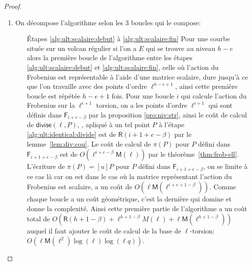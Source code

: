 \documentclass[10pt,a4paper]{book}
\theoremstyle{plain}
\theoremstyle{definition}
\theoremstyle{definition}
\theoremstyle{definition}
\theoremstyle{definition}
\theoremstyle{remark}
\theoremstyle{remark}
\theoremstyle{definition}
\begin{document}
\begin{proof}
\begin{enumerate}


\item On décompose l'algorithme selon les 3 boucles qui le compose:
\begin{enumerate}
\item[\'Etapes \ref{alg:ult:scalaire:debut} à \ref{alg:ult:scalaire:fin}]
Pour une courbe située sur un volcan régulier si l'on a $E$ qui se trouve au 
niveau $h-e$ alors la première boucle de l'algorithme entre les étapes \ref{alg:ult:scalaire:debut} et \ref{alg:ult:scalaire:fin}, celle où l'action du 
Frobenius est représentable à l'aide d'une matrice scalaire, dure jusqu'à ce 
que l'on travaille avec des points d'ordre $\ell^{h-e+1}$, ainsi cette première
 boucle est répétée $h-e+1$ fois. Pour une boucle $i$ qui calcule l'action du 
 Frobenius sur la $\ell^{i+1}$ torsion, on a les points d'ordre $\ell^{i+1}$ 
 qui sont définis dans $\mathsf{F}_{i+e-\beta}$ par la proposition 
 \ref{pro:niv:str}, ainsi le coût de calcul de $\mathsf{divise}(\ell,P)$, , apliqué à un
  tel point $P$ à l'étape 
 \ref{alg:ult:identical:divide} est de $\mathsf{R}(i+1+e-\beta)$ par le 
 lemme~\ref{lem:div:cou}. Le coût de calcul de 
 $\pi(P)$ pour $P$ défini dans $\mathsf{F}_{i+1+e-\beta}$ est de 
 $O(\ell^{i+e-\beta}\mathsf{M}(\ell))$ par le théorème~\ref{thm:frob-ell}. 
 L'écriture de $\pi(P)=[u]P$ pour $P$ défini dans $\mathsf{F}_{i+1+e-\beta}$,  
 on se limite à ce cas là car on est dans le cas où la matrice représentant 
 l'action du Frobenius est scalaire, a un coût de $O(\ell \mathsf{M}(\ell^{i+e+1-\beta}))$. 
 Comme chaque boucle a un coût géométrique, c'est la dernière qui domine et 
 donne la complexité. Ainsi cette première partie de l'algorithme a un coût 
 total de $O(\mathsf{R}(h+1-\beta)+\ell^{h+1-\beta}M(\ell)+\ell\mathsf{M}(\ell^{h+1-\beta}))$ auquel il faut ajouter le coût
  de calcul de la base de $\ell$-torsion: 
  $O(\ell\mathsf{M}(\ell^2)\log(\ell)\log(\ell q))$.


\end{enumerate}
\end{enumerate}
\end{proof}
\end{document}
